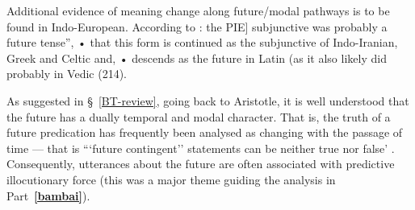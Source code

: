 Additional evidence of meaning change along future/modal pathways is to be found in Indo-European. According to \citet[106]{Fortson2010}: the \acrshort{PIE}] subjunctive was probably a future tense'', • that this form is continued as the subjunctive of Indo-Iranian, Greek and Celtic and, • descends as the future in Latin (as it also likely did probably in Vedic (214).



As suggested in \S~\ref{BT-review}, going back to Aristotle, it is well understood that the future has a dually temporal and modal character. That is, the truth of a future predication has frequently been analysed as changing with the passage of time --- that is ```future contingent'' statements can be neither true nor false' \citep[265]{Thomason1970}. Consequently, utterances about the future are often associated with predictive illocutionary force (this was a major theme guiding the analysis in Part~\textbf{\ref{bambai}}).

